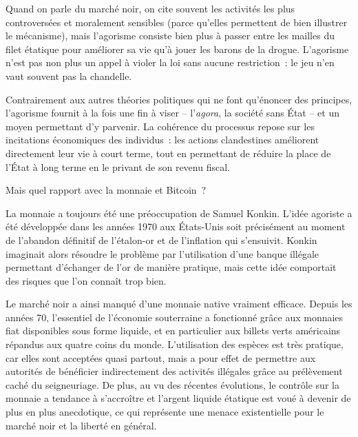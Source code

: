 Quand on parle du marché noir, on cite souvent les activités les plus controversées et moralement sensibles (parce qu'elles permettent de bien illustrer le mécanisme), mais l'agorisme consiste bien plus à passer entre les mailles du filet étatique pour améliorer sa vie qu'à jouer les barons de la drogue. L'agorisme n'est pas non plus un appel à violer la loi sans aucune restriction~: le jeu n'en vaut souvent pas la chandelle. 

Contrairement aux autres théories politiques qui ne font qu'énoncer des principes, l'agorisme fournit à la fois une fin à viser -- l'\emph{agora}, la société sans État -- et un moyen permettant d'y parvenir. La cohérence du processus repose sur les incitations économiques des individus~: les actions clandestines améliorent directement leur vie à court terme, tout en permettant de réduire la place de l'État à long terme en le privant de son revenu fiscal.


Mais quel rapport avec la monnaie et Bitcoin~?

La monnaie a toujours été une préoccupation de Samuel Konkin. L'idée agoriste a été développée dans les années 1970 aux États-Unis soit précisément au moment de l'abandon définitif de l'étalon-or et de l'inflation qui s'ensuivit. Konkin imaginait alors résoudre le problème par l'utilisation d'une banque illégale permettant d'échanger de l'or de manière pratique, mais cette idée comportait des risques que l'on connaît trop bien.

Le marché noir a ainsi manqué d'une monnaie native vraiment efficace. Depuis les années 70, l'essentiel de l'économie souterraine a fonctionné grâce aux monnaies fiat disponibles sous forme liquide, et en particulier aux billets verts américains répandus aux quatre coins du monde. L'utilisation des espèces est très pratique, car elles sont acceptées quasi partout, mais a pour effet de permettre aux autorités de bénéficier indirectement des activités illégales grâce au prélèvement caché du seigneuriage. De plus, au vu des récentes évolutions, le contrôle sur la monnaie a tendance à s'accroître et l'argent liquide étatique est voué à devenir de plus en plus anecdotique, ce qui représente une menace existentielle pour le marché noir et la liberté en général.

